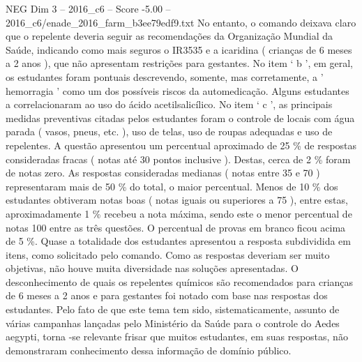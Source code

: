 \begin{textsample}{NEG Dim 3 – 2016\_c6 – Score -5.00 – 2016\_c6/enade\_2016\_farm\_b3ee79edf9.txt}
No entanto, o comando deixava claro que o repelente deveria seguir as recomendações da Organização Mundial da Saúde, indicando como mais seguros o IR3535 e a icaridina ( crianças de 6 meses a 2 anos ), que não apresentam restrições para gestantes.
No item ‘ b ’, em geral, os estudantes foram pontuais descrevendo, somente, mas corretamente, a ' hemorragia ' como um dos possíveis riscos da automedicação.
Alguns estudantes a correlacionaram ao uso do ácido acetilsalicílico.
No item ‘ c ’, as principais medidas preventivas citadas pelos estudantes foram o controle de locais com água parada ( vasos, pneus, etc. ), uso de telas, uso de roupas adequadas e uso de repelentes.
A questão apresentou um percentual aproximado de 25 \% de respostas consideradas fracas ( notas até 30 pontos inclusive ).
Destas, cerca de 2 \% foram de notas zero.
As respostas consideradas medianas ( notas entre 35 e 70 ) representaram mais de 50 \% do total, o maior percentual.
Menos de 10 \% dos estudantes obtiveram notas boas ( notas iguais ou superiores a 75 ), entre estas, aproximadamente 1 \% recebeu a nota máxima, sendo este o menor percentual de notas 100 entre as três questões.
O percentual de provas em branco ficou acima de 5 \%.
Quase a totalidade dos estudantes apresentou a resposta subdividida em itens, como solicitado pelo comando.
Como as respostas deveriam ser muito objetivas, não houve muita diversidade nas soluções apresentadas.
O desconhecimento de quais os repelentes químicos são recomendados para crianças de 6 meses a 2 anos e para gestantes foi notado com base nas respostas dos estudantes.
Pelo fato de que este tema tem sido, sistematicamente, assunto de várias campanhas lançadas pelo Ministério da Saúde para o controle do Aedes aegypti, torna -se relevante frisar que muitos estudantes, em suas respostas, não demonstraram conhecimento dessa informação de domínio público.

\end{textsample}
